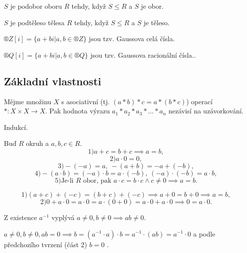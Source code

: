 \documentclass[12pt]{article}                   %
\begin{document}

    \begin{definice}[Podobor]
        $S$ je podobor oboru $R$ tehdy, když $S ≤ R$ a $S$ je obor.
    \end{definice}

    \begin{definice}[Podtěleso]
        $S$ je podtěleso tělesa $R$ tehdy, když $S ≤ R$ a $S$ je těleso.
    \end{definice}

    \begin{definice}
        $®Z[i] = \{a+bi | a, b \in ®Z\}$ jsou tzv. Gaussova celá čísla.
    
        $®Q[i] = \{a+bi | a, b \in ®Q\}$ jsou tzv. Gaussova racionální čísla..
    \end{definice}

    \subsection{Základní vlastnosti}
        \begin{tvrzeni}
            Mějme množinu $X$ s asociativní (tj. $(a*b)*c = a*(b*c)$) operací $*:X \times X \rightarrow X$. Pak hodnota výrazu $a_1*a_2*a_3*…*a_n$ nezávisí na uzávorkování.

            \begin{dukazin}
                Indukcí.
            \end{dukazin}
        \end{tvrzeni}

        \begin{tvrzeni}
            Buď $R$ okruh a $a, b, c \in R$.
            $$ 1) a + c = b + c \implies a = b, $$
            $$ 2) a·0 = 0, $$
            $$ 3) -(-a) = a,\ -(a + b) = -a + (-b), $$
            $$ 4) -(a·b) = (-a)·b = a·(-b),\  (-a)·(-b) = a·b, $$ 
            $$ 5) \text{Je-li $R$ obor, pak } a·c = b·c \land c≠0 \implies a=b. $$ 

            \begin{dukazin}
                $$ 1) (a+c) + (-c) = (b + c) + (-c) \implies a+0 = b+0 \implies a = b, $$
                $$ 2) 0 + a·0 = a·0 = a·(0 + 0) = a·0 + a·0 \implies 0 = a·0. $$
            \end{dukazin}
        \end{tvrzeni}

        \begin{tvrzeni}
            Z existence $a^{-1}$ vyplývá $a≠0, b≠0 \implies ab ≠ 0$.

            \begin{dukazin}[Sporem]
                $a ≠ 0, b ≠ 0, ab=0 \implies b = (a^{-1}·a)·b = a^{-1}·(ab) = a^{-1}·0$ a podle předchozího tvrzení (část 2) $b = 0$ \lightning.
            \end{dukazin}
        \end{tvrzeni}
\end{document}
